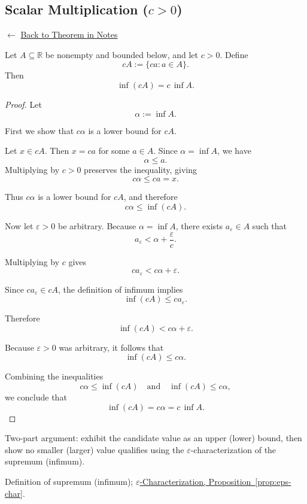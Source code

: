 
\subsection*{Scalar Multiplication ($c > 0$)}
\label{prf:infimum-positive-scalar-multiple}

\begin{remark*}[Return]
$\leftarrow$ \hyperref[thm:scale-pos]{Back to Theorem in Notes}
\end{remark*}

\begin{theorem*}
Let $A \subseteq \mathbb{R}$ be nonempty and bounded below, and let $c>0$.
Define
\[
cA := \{ca : a \in A\}.
\]
Then
\[
\inf(cA) = c\,\inf A.
\]
\end{theorem*}

\begin{proof}
Let
\[
\alpha := \inf A.
\]

First we show that $c\alpha$ is a lower bound for $cA$.

Let $x \in cA$. Then $x = ca$ for some $a \in A$. Since $\alpha = \inf A$, we have
\[
\alpha \le a.
\]
Multiplying by $c>0$ preserves the inequality, giving
\[
c\alpha \le ca = x.
\]

Thus $c\alpha$ is a lower bound for $cA$, and therefore
\[
c\alpha \le \inf(cA).
\]

Now let $\varepsilon > 0$ be arbitrary. Because $\alpha = \inf A$, there exists
$a_\varepsilon \in A$ such that
\[
a_\varepsilon < \alpha + \frac{\varepsilon}{c}.
\]

Multiplying by $c$ gives
\[
c a_\varepsilon < c\alpha + \varepsilon.
\]

Since $c a_\varepsilon \in cA$, the definition of infimum implies
\[
\inf(cA) \le c a_\varepsilon.
\]

Therefore
\[
\inf(cA) < c\alpha + \varepsilon.
\]

Because $\varepsilon > 0$ was arbitrary, it follows that
\[
\inf(cA) \le c\alpha.
\]

Combining the inequalities
\[
c\alpha \le \inf(cA)
\quad\text{and}\quad
\inf(cA) \le c\alpha,
\]
we conclude that
\[
\inf(cA) = c\alpha = c\,\inf A.
\]
\end{proof}

\begin{remark*}
Two-part argument: exhibit the candidate value as an upper (lower) bound,
then show no smaller (larger) value qualifies using the
$\varepsilon$-characterization of the supremum (infimum).
\end{remark*}

\begin{remark*}[Dependencies]
Definition of supremum (infimum); \hyperref[prop:eps-char]{$\varepsilon$-Characterization, Proposition~\ref*{prop:eps-char}}.
\end{remark*}
